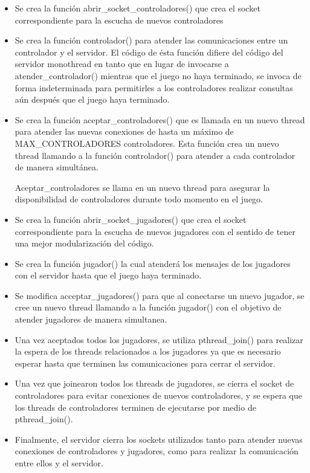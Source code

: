 \documentclass[a4paper,10pt,twoside]{article}
\begin{document}
\begin{itemize}
    \item Se crea la función abrir\_socket\_controladores() que crea el socket correspondiente para la escucha de nuevos controladores
    
    \item Se crea la función controlador() para atender las comunicaciones entre un controlador y el servidor. El código de ésta función difiere del código del servidor monothread en tanto que en lugar de invocarse a atender\_controlador() mientras que el juego no haya terminado, se invoca de forma indeterminada para permitirles a los controladores realizar consultas aún después que el juego haya terminado.
    
    \item Se crea la función aceptar\_controladores() que es llamada en un nuevo thread para atender las nuevas conexiones de hasta un máximo de MAX\_CONTROLADORES controladores. Esta función crea un nuevo thread llamando a la función controlador() para atender a cada controlador de manera simultánea.

    Aceptar\_controladores  se llama en un nuevo thread para asegurar la disponibilidad de controladores durante todo momento en el juego.
    
    \item Se crea la función abrir\_socket\_jugadores() que crea el socket correspondiente para la escucha de nuevos jugadores con el sentido de tener una mejor modularización del código.
    
    \item Se crea la función jugador() la cual atenderá los mensajes de los jugadores con el servidor hasta que el juego haya terminado.
    
    \item Se modifica acceptar\_jugadores() para que al conectarse un nuevo jugador, se cree un nuevo thread llamando a la función jugador() con el objetivo de atender jugadores de manera simultanea.
    
    \item Una vez aceptados todos los jugadores, se utiliza pthread\_join() para realizar la espera de los threads relacionados a los jugadores ya que es necesario esperar hasta que terminen las comunicaciones para cerrar el servidor.
    
    \item Una vez que joinearon todos los threads de jugadores, se cierra el socket de controladores para evitar conexiones de nuevos controladores, y se espera que los threads de controladores terminen de ejecutarse por medio de pthread\_join().

    \item Finalmente, el servidor cierra los sockets utilizados tanto para atender nuevas conexiones de controladores y jugadores, como para realizar la comunicación entre ellos y el servidor.
\end{itemize}
\end{document}
